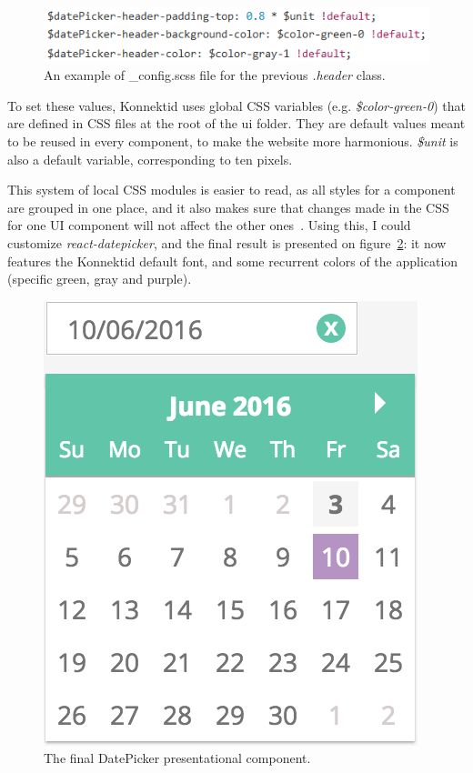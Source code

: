 \begin{figure}[H]
    \centering
    \includegraphics{figure/config.png}
    \caption{An example of \guillemotleft{} \_config.scss \guillemotright{} file for the previous \textit{.header} class.}
    \label{fig:config}
\end{figure}

To set these values, Konnektid uses global CSS variables (e.g. \textit{\$color-green-0}) that are defined in CSS files at the root of the \guillemotleft{} ui \guillemotright{} folder. They are default values meant to be reused in every component, to make the website more harmonious. \textit{\$unit} is also a default variable, corresponding to ten pixels.

This system of local CSS modules is easier to read, as all styles for a component are grouped in one place, and it also makes sure that changes made in the CSS for one UI component will not affect the other ones~\cite{localCSS}. Using this, I could customize \textit{react-datepicker}, and the final result is presented on {\sc figure}~\ref{fig:datePicker}: it now features the Konnektid default font, and some recurrent colors of the application (specific green, gray and purple).

\begin{figure}[H]
    \centering
    \includegraphics[scale=0.6]{figure/datePicker.png}
    \caption{The final DatePicker presentational component.}
    \label{fig:datePicker}
\end{figure}

